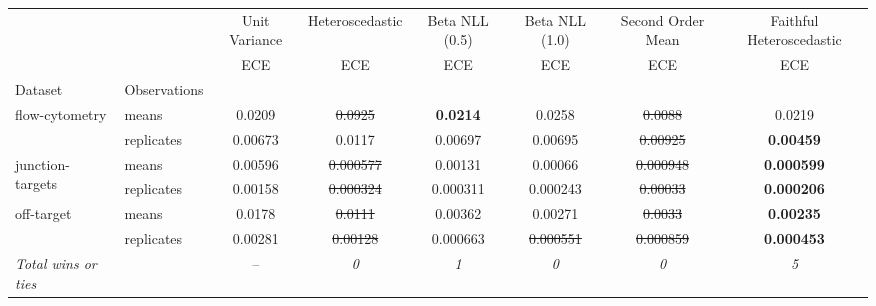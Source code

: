 \begin{tabular}{ll|c|c|c|c|c|c}
\toprule
{} & {} & {Unit Variance} & {Heteroscedastic} & {Beta NLL (0.5)} & {Beta NLL (1.0)} & {Second Order Mean} & {Faithful Heteroscedastic} \\
{} & {} & {ECE} & {ECE} & {ECE} & {ECE} & {ECE} & {ECE} \\
{Dataset} & {Observations} & {} & {} & {} & {} & {} & {} \\
\midrule
\multirow[t]{2}{*}{flow-cytometry} & means & 0.0209 & \sout{0.0925} & \textbf{0.0214} & 0.0258 & \sout{0.0088} & 0.0219 \\
 & replicates & 0.00673 & 0.0117 & 0.00697 & 0.00695 & \sout{0.00925} & \textbf{0.00459} \\
\multirow[t]{2}{*}{junction-targets} & means & 0.00596 & \sout{0.000577} & 0.00131 & 0.00066 & \sout{0.000948} & \textbf{0.000599} \\
 & replicates & 0.00158 & \sout{0.000324} & 0.000311 & 0.000243 & \sout{0.00033} & \textbf{0.000206} \\
\multirow[t]{2}{*}{off-target} & means & 0.0178 & \sout{0.0111} & 0.00362 & 0.00271 & \sout{0.0033} & \textbf{0.00235} \\
 & replicates & 0.00281 & \sout{0.00128} & 0.000663 & \sout{0.000551} & \sout{0.000859} & \textbf{0.000453} \\
\textit{{Total wins or ties}} &  & -- & \textit{0} & \textit{1} & \textit{0} & \textit{0} & \textit{5} \\
\bottomrule
\end{tabular}
